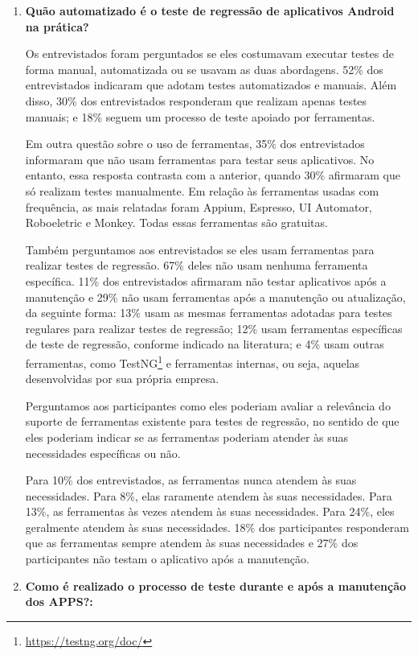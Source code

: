\begin{enumerate}[label=\bf QP\arabic*]
    
\item \textbf{Quão automatizado é o teste de regressão de aplicativos Android na prática?}
    
Os entrevistados foram perguntados se eles costumavam executar testes de forma manual, automatizada ou se usavam as duas abordagens. 52\% dos entrevistados indicaram que adotam testes automatizados e manuais. Além disso, 30\% dos entrevistados responderam que realizam apenas testes manuais; e 18\% seguem um processo de teste apoiado por ferramentas.
 
Em outra questão sobre o uso de ferramentas, 35\% dos entrevistados informaram que não usam ferramentas para testar seus aplicativos. No entanto, essa resposta contrasta com a anterior, quando 30\% afirmaram que só realizam testes manualmente. Em relação às ferramentas usadas com frequência, as mais relatadas foram Appium, Espresso, UI Automator, Roboeletric e Monkey. Todas essas ferramentas são gratuitas.
 
Também perguntamos aos entrevistados se eles usam ferramentas para realizar testes de regressão. 67\% deles não usam nenhuma ferramenta específica. 11\% dos entrevistados afirmaram não testar aplicativos após a manutenção e 29\% não usam ferramentas após a manutenção ou atualização, da seguinte forma: 13\% usam as mesmas ferramentas adotadas para testes regulares para realizar testes de regressão; 12\% usam ferramentas específicas de teste de regressão, conforme indicado na literatura; e 4\% usam outras ferramentas, como TestNG\footnote{\url{https://testng.org/doc/}} e ferramentas internas, ou seja, aquelas desenvolvidas por sua própria empresa.

Perguntamos aos participantes como eles poderiam avaliar a relevância do suporte de ferramentas existente para testes de regressão, no sentido de que eles poderiam indicar se as ferramentas poderiam atender às suas necessidades específicas ou não.

Para 10\% dos entrevistados, as ferramentas nunca atendem às suas necessidades. Para 8\%, elas raramente atendem às suas necessidades. Para 13\%, as ferramentas às vezes atendem às suas necessidades. Para 24\%, eles geralmente atendem às suas necessidades. 18\% dos participantes responderam que as ferramentas sempre atendem às suas necessidades e 27\% dos participantes não testam o aplicativo após a manutenção.
    
\item \textbf{Como é realizado o processo de teste durante e após a manutenção dos \ac{APPS}?:}


\end{enumerate}
